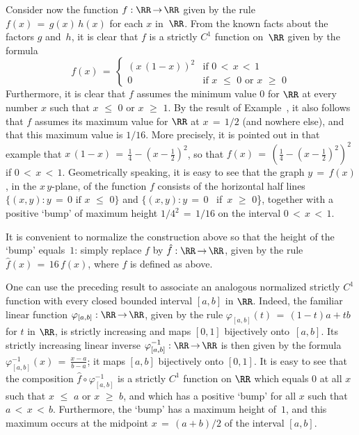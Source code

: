 {        Consider now the function $f:{\RR} \,{\rightarrow}\, {\RR}$ given by the rule $f(x) \,=\, g(x)\,h(x)$ for each $x$ in~${\RR}$.
    From the known facts about the factors $g$ and~$h$, it is clear that $f$ is a strictly $C^{1}$ function on~${\RR}$ given by the formula
        \begin{displaymath}
        f(x) \,=\, \left\{
        \begin{array}{ll}
       ( x\,(1-x))^{2} & \mbox{if $0\,<\,x\,<\,1$} \\
          0         & \mbox{if $x\,\,{\leq}\,\,0 \mbox{ or }x\,\,{\geq}\,\,0$}
        \end{array}
                            \right.
        \end{displaymath}
    Furthermore, it is clear that $f$ assumes the minimum value $0$ for ${\RR}$ at every number $x$ such that $x\,\,{\leq}\,\,0$ or $x\,\,{\geq}\,\,1$.
    By the result of Example~, it also follows that $f$ assumes its maximum value for ${\RR}$ at $x \,=\, 1/2$ (and nowhere else),
    and that this maximum value is $1/16$. More precisely, it is pointed out in that example that
    ${\displaystyle x\,(1-x) \,=\, \frac{1}{4} - \left(x-\frac{1}{2}\right)^{2}}$,
    so that ${\displaystyle f(x) \,=\, \left(\frac{1}{4} - \left(x-\frac{1}{2}\right)^{2}\right)^{2}}$ if $0\,<\,x\,<\,1$.
    Geometrically speaking, it is easy to see that the graph $y \,=\, f(x)$, in the $x\,y$-plane,
    of the function $f$ consists of the horizontal half lines $\{(x,y): y \,=\, 0 \mbox{ if $x\,\,{\leq}\,\,0$}\}$
    and $\{(x,y): y \,=\, 0$ \mbox{ if $x\,\,{\geq}\,\,0$}\}, together with a positive `bump' of maximum height $1/4^{2} \,=\, 1/16$ on the interval $0\,<\,x\,<\,1$.

        It is convenient to normalize the construction above so that the height of the `bump' equals~$1$:
    simply replace $f$ by $\hat{f}:{\RR} \,{\rightarrow}\, {\RR}$, given by the rule $\hat{f}(x) \,=\, 16\,f(x)$, where $f$ is defined as above.

\V

        One can use the preceding result to associate an analogous normalized strictly $C^{1}$ function with every closed bounded interval $[a,b]$ in ${\RR}$.
    Indeed, the familiar linear function ${\varphi}_{[a,b]}:{\RR} \,{\rightarrow}\,{\RR}$,
    given by the rule ${\varphi}_{[a,b]}(t) \,=\, (1-t)a+tb$ for $t$ in ${\RR}$, is strictly increasing and maps $[0,1]$ bijectively onto~$[a,b]$.
    Its strictly increasing linear inverse ${\varphi}_{[a,b]}^{-1}:{\RR} \,{\rightarrow}\, {\RR}$
    is then given by the formula ${\varphi}_{[a,b]}^{-1}(x) \,=\, {\displaystyle \frac{x-a}{b-a}}$; it maps $[a,b]$ bijectively onto $[0,1]$.
    It is easy to see that the composition $\hat{f}{\circ}{\varphi}_{[a,b]}^{-1}$ is a strictly $C^{1}$ function on ${\RR}$
    which equals $0$ at all $x$ such that $x\,\,{\leq}\,\,a$ or $x\,\,{\geq}\,\,b$,
    and which has a positive `bump' for all $x$ such that $a\,<\,x\,<\,b$. Furthermore, the `bump' has a maximum height of~$1$,
    and this maximum occurs at the midpoint $x \,=\, (a+b)/2$ of the interval $[a,b]$.

}
